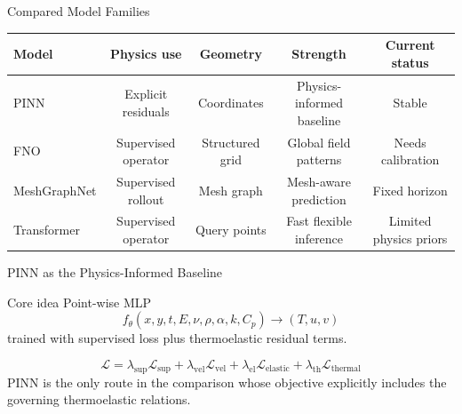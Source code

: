 \documentclass[aspectratio=169,10pt]{beamer}
\begin{document}
\begin{frame}{Compared Model Families}
  \footnotesize
  \begin{tabular}{@{}lcccc@{}}
    \toprule
    \textbf{Model} & \textbf{Physics use} & \textbf{Geometry} & \textbf{Strength} & \textbf{Current status} \\
    \midrule
    PINN & Explicit residuals & Coordinates & Physics-informed baseline & Stable \\
    FNO & Supervised operator & Structured grid & Global field patterns & Needs calibration \\
    MeshGraphNet & Supervised rollout & Mesh graph & Mesh-aware prediction & Fixed horizon \\
    Transformer & Supervised operator & Query points & Fast flexible inference & Limited physics priors \\
    \bottomrule
  \end{tabular}
\end{frame}

\begin{frame}{PINN as the Physics-Informed Baseline}
  \begin{block}{Core idea}
    Point-wise MLP
    \[
      f_{\theta}(x,y,t,E,\nu,\rho,\alpha,k,C_p)\rightarrow(T,u,v)
    \]
    trained with supervised loss plus thermoelastic residual terms.
  \end{block}
  \vskip 4pt
  \[
    \mathcal{L}
    =
    \lambda_{\mathrm{sup}}\mathcal{L}_{\mathrm{sup}}
    +
    \lambda_{\mathrm{vel}}\mathcal{L}_{\mathrm{vel}}
    +
    \lambda_{\mathrm{el}}\mathcal{L}_{\mathrm{elastic}}
    +
    \lambda_{\mathrm{th}}\mathcal{L}_{\mathrm{thermal}}
  \]
  \vskip 4pt
  PINN is the only route in the comparison whose objective explicitly
  includes the governing thermoelastic relations.
\end{frame}
\end{document}
